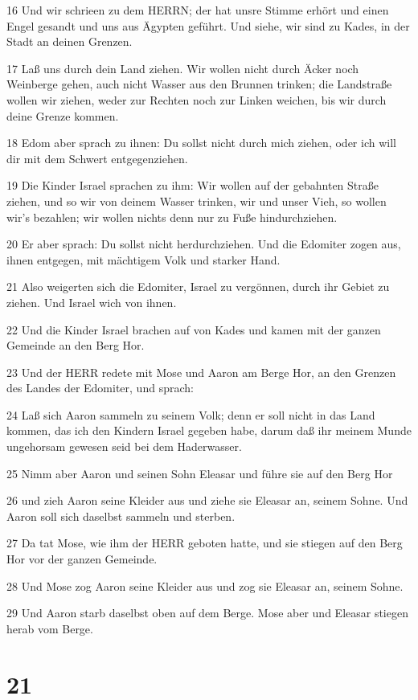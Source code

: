 \par 16 Und wir schrieen zu dem HERRN; der hat unsre Stimme erhört und einen Engel gesandt und uns aus Ägypten geführt. Und siehe, wir sind zu Kades, in der Stadt an deinen Grenzen.
\par 17 Laß uns durch dein Land ziehen. Wir wollen nicht durch Äcker noch Weinberge gehen, auch nicht Wasser aus den Brunnen trinken; die Landstraße wollen wir ziehen, weder zur Rechten noch zur Linken weichen, bis wir durch deine Grenze kommen.
\par 18 Edom aber sprach zu ihnen: Du sollst nicht durch mich ziehen, oder ich will dir mit dem Schwert entgegenziehen.
\par 19 Die Kinder Israel sprachen zu ihm: Wir wollen auf der gebahnten Straße ziehen, und so wir von deinem Wasser trinken, wir und unser Vieh, so wollen wir's bezahlen; wir wollen nichts denn nur zu Fuße hindurchziehen.
\par 20 Er aber sprach: Du sollst nicht herdurchziehen. Und die Edomiter zogen aus, ihnen entgegen, mit mächtigem Volk und starker Hand.
\par 21 Also weigerten sich die Edomiter, Israel zu vergönnen, durch ihr Gebiet zu ziehen. Und Israel wich von ihnen.
\par 22 Und die Kinder Israel brachen auf von Kades und kamen mit der ganzen Gemeinde an den Berg Hor.
\par 23 Und der HERR redete mit Mose und Aaron am Berge Hor, an den Grenzen des Landes der Edomiter, und sprach:
\par 24 Laß sich Aaron sammeln zu seinem Volk; denn er soll nicht in das Land kommen, das ich den Kindern Israel gegeben habe, darum daß ihr meinem Munde ungehorsam gewesen seid bei dem Haderwasser.
\par 25 Nimm aber Aaron und seinen Sohn Eleasar und führe sie auf den Berg Hor
\par 26 und zieh Aaron seine Kleider aus und ziehe sie Eleasar an, seinem Sohne. Und Aaron soll sich daselbst sammeln und sterben.
\par 27 Da tat Mose, wie ihm der HERR geboten hatte, und sie stiegen auf den Berg Hor vor der ganzen Gemeinde.
\par 28 Und Mose zog Aaron seine Kleider aus und zog sie Eleasar an, seinem Sohne.
\par 29 Und Aaron starb daselbst oben auf dem Berge. Mose aber und Eleasar stiegen herab vom Berge.

\chapter{21}

